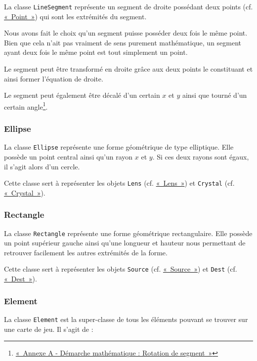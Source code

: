 \documentclass[]{report}
\begin{document}
La classe \texttt{LineSegment} représente un segment de droite possédant
deux points (cf. \hyperref[Point]{«~Point~»}) qui sont les extrémités du segment.

Nous avons fait le choix qu'un segment puisse posséder deux fois le même point.
Bien que cela n'ait pas vraiment de sens purement mathématique, un segment
ayant deux fois le même point est tout simplement un point.

Le segment peut être transformé en droite grâce aux deux points
le constituant et ainsi former l'équation de droite.

Le segment peut également être décalé d'un certain $ x $ et $ y $ ainsi que tourné 
d'un certain angle\footnote{\hyperref[AnnexeRotation]{«~Annexe A - Démarche mathématique : Rotation de segment~»}}.

\subsubsection{\label{Ellipse}Ellipse}

La classe \texttt{Ellipse} représente une forme géométrique de type elliptique.
Elle possède un point central ainsi qu'un rayon $x$ et $y$. Si ces deux
rayons sont égaux, il s'agit alors d'un cercle.

Cette classe sert à représenter les objets \texttt{Lens} (cf. \hyperref[Lens]{«~Lens~»}) et \texttt{Crystal} (cf. \hyperref[Crystal]{«~Crystal~»}).

\subsubsection{\label{Rectangle}Rectangle}

La classe \texttt{Rectangle} représente une forme géométrique rectangulaire.
Elle possède un point supérieur gauche ainsi qu'une longueur et hauteur 
nous permettant de retrouver facilement les autres extrémités de la 
forme.

Cette classe sert à représenter les objets \texttt{Source} (cf. \hyperref[Source]{«~Source~»}) et \texttt{Dest} (cf. \hyperref[Dest]{«~Dest~»}).

\subsubsection{\label{Element}Element}

La classe \texttt{Element} est la super-classe de tous les éléments pouvant
se trouver sur une carte de jeu.
Il s'agit de :
\end{document}
